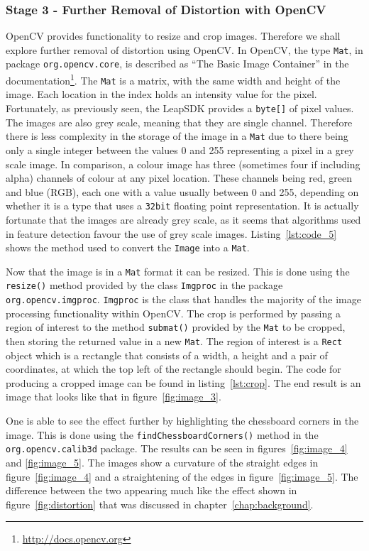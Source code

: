 \documentclass[11pt,oneside]{report}
\newcommand\code[1]{\texttt{#1}}
\begin{document}
		\subsubsection{Stage 3 - Further Removal of Distortion with OpenCV}
		OpenCV provides functionality to resize and crop images.
		Therefore we shall explore further removal of distortion using OpenCV.
		In OpenCV, the type \code{Mat}, in package \code{org.opencv.core}, is described as ``The Basic Image Container'' in the documentation\footnote{\url{http://docs.opencv.org}}.
		The \code{Mat} is a matrix, with the same width and height of the image.
		Each location in the index holds an intensity value for the pixel.
		Fortunately, as previously seen, the LeapSDK provides a \code{byte[]} of pixel values.
		The images are also grey scale, meaning that they are single channel.
		Therefore there is less complexity in the storage of the image in a \code{Mat} due to there being only a single integer between the values 0 and 255 representing a pixel in a grey scale image.
		In comparison, a colour image has three (sometimes four if including alpha) channels of colour at any pixel location.
		These channels being red, green and blue (RGB), each one with a value usually between 0 and 255, depending on whether it is a type that uses a \code{32bit} floating point representation.
		It is actually fortunate that the images are already grey scale, as it seems that algorithms used in feature detection favour the use of grey scale images.
		Listing~\ref{lst:code_5} shows the method used to convert the \code{Image} into a \code{Mat}.
		\clearpage
		
		Now that the image is in a \code{Mat} format it can be resized.
		This is done using the \code{resize()} method provided by the class \code{Imgproc} in the package \code{org.opencv.imgproc}.
		\code{Imgproc} is the class that handles the majority of the image processing functionality within OpenCV.
		The crop is performed by passing a region of interest to the method \code{submat()} provided by the \code{Mat} to be cropped, then storing the returned value in a new \code{Mat}.
		The region of interest is a \code{Rect} object which is a rectangle that consists of a width, a height and a pair of coordinates, at which the top left of the rectangle should begin.
		The code for producing a cropped image can be found in listing~\ref{lst:crop}.
		The end result is an image that looks like that in figure~\ref{fig:image_3}.
		
		One is able to see the effect further by highlighting the chessboard corners in the image.
		This is done using the \code{findChessboardCorners()} method in the \code{org.opencv.calib3d} package.
		The results can be seen in figures~\ref{fig:image_4} and \ref{fig:image_5}.
		The images show a curvature of the straight edges in figure~\ref{fig:image_4} and a straightening of the edges in figure~\ref{fig:image_5}.
		The difference between the two appearing much like the effect shown in figure~\ref{fig:distortion} that was discussed in chapter~\ref{chap:background}.
\end{document}
